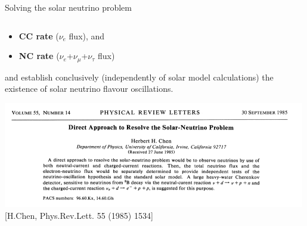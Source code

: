 \begin{frame}[t]{Solving the solar neutrino problem}
\begin{columns}
\begin{column}{0.65\textwidth}
{\begin{itemize}
       \item {\bf CC rate} ($\nu_{e}$ flux), and
       \item {\bf NC rate} ($\nu_{e}$+$\nu_{\mu}$+$\nu_{\tau}$ flux)
     \end{itemize}
     and establish conclusively ({\color{red}independently of solar model calculations})
     the existence of solar neutrino flavour oscillations.\\
     }
     \vspace{0.3cm}
     {
       \centering
       \includegraphics[width=0.99\textwidth]{./images/3nu/solar/chen_prl_abstract.png}\\
       {\scriptsize \color{blue}[H.Chen, Phys.Rev.Lett. 55 (1985) 1534]}\\
     }
  \end{column}
\end{columns}
\end{frame}

